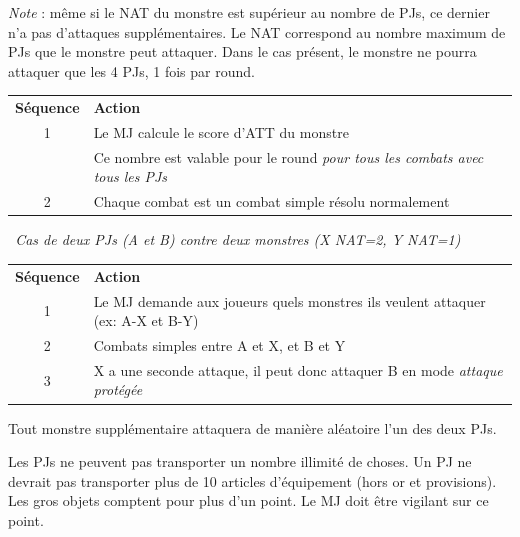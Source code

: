 \begin{frame}[b]
{\begin{minipage}[c][0.95\textheight][c]{\linewidth}
\textit{Note} : même si le NAT du monstre est supérieur au nombre de PJs, ce dernier n'a pas d'attaques supplémentaires. Le NAT correspond au nombre maximum de PJs que le monstre peut attaquer. Dans le cas présent, le monstre ne pourra attaquer que les 4 PJs, 1 fois par round.

\vspace{0.2cm}

\begin{tabular}{cp{7.1cm}}
\textbf{Séquence} & \textbf{Action} \\
         1 & Le MJ calcule le score d'ATT du monstre                         \\
           & Ce nombre est valable pour le round \textit{pour tous les combats avec tous les PJs} \\
         2 & Chaque combat est un combat simple résolu normalement              \\
\end{tabular}

\vspace{0.2cm}

\textit{\mybullet\ Cas de deux PJs (A et B) contre deux monstres (X NAT=2, Y NAT=1)}

\vspace{0.2cm}

\begin{tabular}{cp{7.1cm}}
\textbf{Séquence} & \textbf{Action} \\
         1 & Le MJ demande aux joueurs quels monstres ils veulent attaquer (ex: A-X et B-Y) \\
         2 & Combats simples entre A et X, et B et Y                   \\
         3 & X a une seconde attaque, il peut donc attaquer B en mode \textit{attaque protégée} \\
\end{tabular}

\vspace{0.2cm}

\myindent Tout monstre supplémentaire attaquera de manière aléatoire l'un des deux PJs.



\myindent Les PJs ne peuvent pas transporter un nombre illimité de choses. Un PJ ne devrait pas transporter plus de 10 articles d'équipement (hors or et provisions). Les gros objets comptent pour plus d'un point. Le MJ doit être vigilant sur ce point.


\end{minipage}}
\end{frame}
